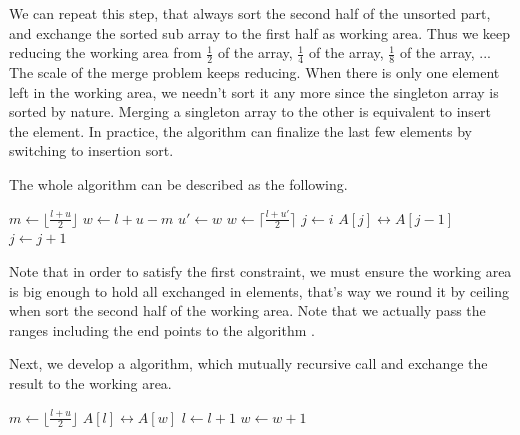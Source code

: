 \documentclass[b5paper]{article}
\begin{document}
We can repeat this step, that always sort the second half of the unsorted part, and exchange
the sorted sub array to the first half as working area. Thus we keep reducing the working area
from $\frac{1}{2}$ of the array, $\frac{1}{4}$
of the array, $\frac{1}{8}$ of the array, ... The scale of the merge problem keeps reducing.
When there is only one element left in the working area, we needn't sort it any more since
the singleton array is sorted by nature. Merging a singleton array to the other is equivalent
to insert the element. In practice, the algorithm can finalize the last few
elements by switching to insertion sort.

The whole algorithm can be described as the following.

\begin{algorithmic}[1]
    \State $m \gets \lfloor \frac{l + u}{2} \rfloor$
    \State $w \gets l + u - m$
    \State {} 
      \State $u' \gets w$
      \State $w \gets \lceil \frac{l + u'}{2} \rceil$ 
      \State {} 
      \State {}
    \EndWhile
     
      \State $j \gets i$
        \State {} $A[j] \leftrightarrow A[j-1]$
        \State $j \gets j + 1$
      \EndWhile
    \EndFor
  \EndIf
\EndProcedure
\end{algorithmic}

Note that in order to satisfy the first constraint, we must ensure the working area is big enough to hold
all exchanged in elements, that's way we round it by ceiling when sort the second half of the working area.
Note that we actually pass the ranges including the end points to the algorithm .

Next, we develop a  algorithm, which mutually recursive call  and exchange the result
to the working area.

\begin{algorithmic}[1]
    \State $m \gets \lfloor \frac{l + u}{2} \rfloor$
    \State {}
    \State {}
    \State {}
  \Else {}
      \State {} $A[l] \leftrightarrow A[w]$
      \State $l \gets l + 1$
      \State $w \gets w + 1$
    \EndWhile
  \EndIf
\EndProcedure
\end{algorithmic}
\end{document}
